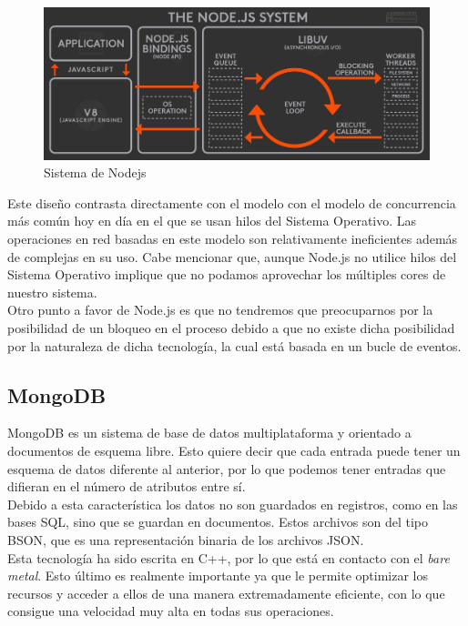 \begin{figure}[H]
	\centering
	\includegraphics[scale=0.25]{imagenes/nodejs_system.jpg}
	\caption{Sistema de Nodejs \label{fig:figura1}}
\end{figure}

Este diseño contrasta directamente con el modelo con el modelo de concurrencia más común hoy en 
día en el que se usan hilos del Sistema Operativo. Las operaciones en red basadas en este modelo
son relativamente ineficientes además de complejas en su uso. Cabe mencionar que, aunque Node.js 
no utilice hilos del Sistema Operativo implique que no podamos aprovechar los múltiples cores
de nuestro sistema.\\

Otro punto a favor de Node.js es que no tendremos que preocuparnos por la posibilidad de un 
bloqueo en el proceso debido a que no existe dicha posibilidad por la naturaleza de dicha 
tecnología, la cual está basada en un bucle de eventos.

\subsection{MongoDB}

MongoDB es un sistema de base de datos multiplataforma y orientado a documentos de esquema libre.
Esto quiere decir que cada entrada puede tener un esquema de datos diferente al anterior, por
lo que podemos tener entradas que difieran en el número de atributos entre sí.\\

Debido a esta característica los datos no son guardados en registros, como en las bases SQL, 
sino que se guardan en documentos. Estos archivos son del tipo BSON, que es una representación
binaria de los archivos JSON.\\

Esta tecnología ha sido escrita en C++, por lo que está en contacto con el \textit{bare metal}. Esto
último es realmente importante ya que le permite optimizar los recursos y acceder a ellos de una 
manera extremadamente eficiente, con lo que consigue una velocidad muy alta en todas sus operaciones.\\

